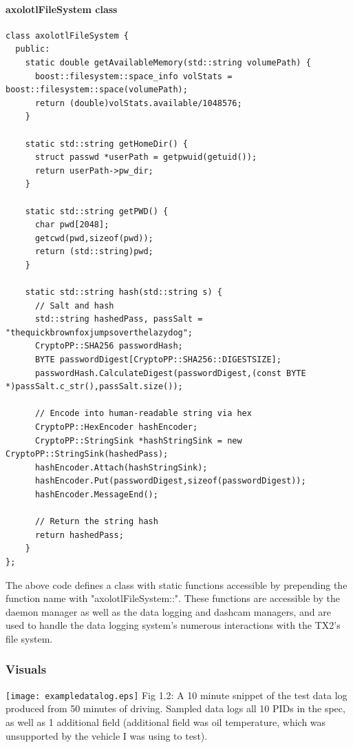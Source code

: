 \documentclass[onecolumn, draftclsnofoot,10pt, compsoc]{IEEEtran}
\begin{document}
\paragraph{axolotlFileSystem class}
\begin{verbatim}
class axolotlFileSystem {
  public:
    static double getAvailableMemory(std::string volumePath) {
      boost::filesystem::space_info volStats = boost::filesystem::space(volumePath);
      return (double)volStats.available/1048576;
    }

    static std::string getHomeDir() {
      struct passwd *userPath = getpwuid(getuid());
      return userPath->pw_dir;
    }

    static std::string getPWD() {
      char pwd[2048];
      getcwd(pwd,sizeof(pwd));
      return (std::string)pwd;
    }

    static std::string hash(std::string s) {
      // Salt and hash
      std::string hashedPass, passSalt = "thequickbrownfoxjumpsoverthelazydog";
      CryptoPP::SHA256 passwordHash;
      BYTE passwordDigest[CryptoPP::SHA256::DIGESTSIZE];
      passwordHash.CalculateDigest(passwordDigest,(const BYTE *)passSalt.c_str(),passSalt.size());

      // Encode into human-readable string via hex
      CryptoPP::HexEncoder hashEncoder;
      CryptoPP::StringSink *hashStringSink = new CryptoPP::StringSink(hashedPass);
      hashEncoder.Attach(hashStringSink);
      hashEncoder.Put(passwordDigest,sizeof(passwordDigest));
      hashEncoder.MessageEnd();

      // Return the string hash
      return hashedPass;
    }
};
\end{verbatim}
\par The above code defines a class with static functions accessible by prepending the function name with "axolotlFileSystem::". These functions are accessible by the daemon manager as well as the data logging and dashcam managers, and are used to handle the data logging system's numerous interactions with the TX2's file system.

\subsubsection{Visuals}
\texttt{[image: exampledatalog.eps]}
Fig 1.2: A 10 minute snippet of the test data log produced from 50 minutes of driving. Sampled data logs all 10 PIDs in the spec, as well as 1 additional field (additional field was oil temperature, which was unsupported by the vehicle I was using to test).
\end{document}
